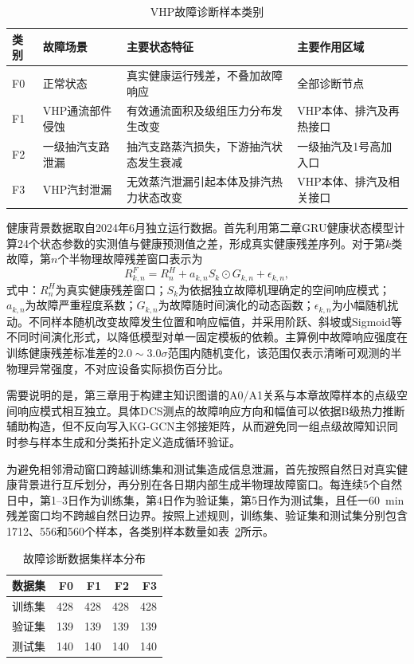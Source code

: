 \begin{table}[htbp]
    \centering
    \caption{VHP故障诊断样本类别}
    \label{tab:fault_classes_v5}
    \begin{tabular}{p{1.0cm}p{4.1cm}p{5.3cm}p{3.4cm}}
        \toprule
        类别 & 故障场景 & 主要状态特征 & 主要作用区域 \\
        \midrule
        F0 & 正常状态 & 真实健康运行残差，不叠加故障响应 & 全部诊断节点 \\
        F1 & VHP通流部件侵蚀 & 有效通流面积及级组压力分布发生改变 & VHP本体、排汽及再热接口 \\
        F2 & 一级抽汽支路泄漏 & 抽汽支路蒸汽损失，下游抽汽状态发生衰减 & 一级抽汽及1号高加入口 \\
        F3 & VHP汽封泄漏 & 无效蒸汽泄漏引起本体及排汽热力状态改变 & VHP本体、排汽及相关接口 \\
        \bottomrule
    \end{tabular}
\end{table}

健康背景数据取自2024年6月独立运行数据。首先利用第二章GRU健康状态模型计算24个状态参数的实测值与健康预测值之差，形成真实健康残差序列。对于第$k$类故障，第$n$个半物理故障残差窗口表示为
\begin{equation}
R_{k,n}^{F}=R_n^{H}+a_{k,n}S_k\odot G_{k,n}+\epsilon_{k,n},
\end{equation}
式中：$R_n^{H}$为真实健康残差窗口；$S_k$为依据独立故障机理确定的空间响应模式；$a_{k,n}$为故障严重程度系数；$G_{k,n}$为故障随时间演化的动态函数；$\epsilon_{k,n}$为小幅随机扰动。不同样本随机改变故障发生位置和响应幅值，并采用阶跃、斜坡或Sigmoid等不同时间演化形式，以降低模型对单一固定模板的依赖。主算例中故障响应强度在训练健康残差标准差的$2.0\sim3.0\sigma$范围内随机变化，该范围仅表示清晰可观测的半物理异常强度，不对应设备实际损伤百分比。

需要说明的是，第三章用于构建主知识图谱的A0/A1关系与本章故障样本的点级空间响应模式相互独立。具体DCS测点的故障响应方向和幅值可以依据B级热力推断辅助构造，但不反向写入KG-GCN主邻接矩阵，从而避免同一组点级故障知识同时参与样本生成和分类拓扑定义造成循环验证。

为避免相邻滑动窗口跨越训练集和测试集造成信息泄漏，首先按照自然日对真实健康背景进行互斥划分，再分别在各日期内部生成半物理故障窗口。每连续5个自然日中，第1--3日作为训练集，第4日作为验证集，第5日作为测试集，且任一60~min残差窗口均不跨越自然日边界。按照上述规则，训练集、验证集和测试集分别包含1712、556和560个样本，各类别样本数量如表~\ref{tab:fault_dataset_v5}所示。

\begin{table}[htbp]
    \centering
    \caption{故障诊断数据集样本分布}
    \label{tab:fault_dataset_v5}
    \begin{tabular}{lrrrr}
        \toprule
        数据集 & F0 & F1 & F2 & F3 \\
        \midrule
        训练集 & 428 & 428 & 428 & 428 \\
        验证集 & 139 & 139 & 139 & 139 \\
        测试集 & 140 & 140 & 140 & 140 \\
        \bottomrule
    \end{tabular}
\end{table}

